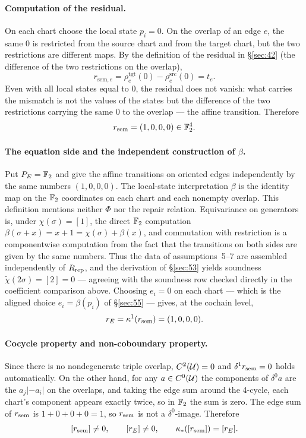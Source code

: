 \begin{example}
\paragraph{Computation of the residual.}
On each chart choose the local state $p_i=0$. On the overlap of an
edge $e$, the same $0$ is restricted from the source chart and from
the target chart, but the two restrictions are different maps. By the
definition of the residual in \S\ref{sec:42} (the difference of the
two restrictions on the overlap),
\[
r_{\mathrm{sem},e}
=\rho^{\mathrm{tgt}}_e(0)-\rho^{\mathrm{src}}_e(0)
=t_e.
\]
Even with all local states equal to $0$, the residual does not
vanish: what carries the mismatch is not the values of the states but
the difference of the two restrictions carrying the same $0$ to the
overlap --- the affine transition. Therefore
\[
r_{\mathrm{sem}}=(1,0,0,0)\in\mathbb{F}_{2}^4.
\]

\paragraph{The equation side and the independent construction of $\beta$.}
Put $P_{E}=\mathbb{F}_{2}$ and give the affine transitions on oriented edges
independently by the same numbers $(1,0,0,0)$. The local-state
interpretation $\beta$ is the identity map on the $\mathbb{F}_{2}$ coordinates
on each chart and each nonempty overlap. This definition mentions
neither $\Phi$ nor the repair relation. Equivariance on generators
is, under $\chi(\sigma)=[1]$, the direct $\mathbb{F}_{2}$ computation
$\beta(\sigma+x)=x+1=\chi(\sigma)+\beta(x)$, and commutation with
restriction is a componentwise computation from the fact that the
transitions on both sides are given by the same numbers. Thus the
data of assumptions~5--7 are assembled independently of $R_{\mathrm{rep}}$, and
the derivation of \S\ref{sec:53} yields soundness
$\widetilde\chi(2\sigma)=[2]=0$ --- agreeing with the soundness row
checked directly in the coefficient comparison above. Choosing
$e_i=0$ on each chart --- which is the aligned choice
$e_i=\beta(p_i)$ of \S\ref{sec:55} --- gives, at the cochain level,
\[
r_{E}=\kappa^1(r_{\mathrm{sem}})=(1,0,0,0).
\]

\paragraph{Cocycle property and non-coboundary property.}
Since there is no nondegenerate triple overlap, $C^2(\mathcal{U})=0$ and
$\delta^1r_{\mathrm{sem}}=0$ holds automatically. On the other hand, for any
$a\in C^0(\mathcal{U})$ the components of $\delta^0a$ are the
$a_j|-a_i|$ on the overlaps, and taking the edge sum around the
4-cycle, each chart's component appears exactly twice, so in $\mathbb{F}_{2}$
the sum is zero. The edge sum of $r_{\mathrm{sem}}$ is $1+0+0+0=1$, so $r_{\mathrm{sem}}$
is not a $\delta^0$-image. Therefore
\[
[r_{\mathrm{sem}}]\ne0,\qquad
[r_{E}]\ne0,\qquad
\kappa_*([r_{\mathrm{sem}}])=[r_{E}].
\]


\end{example}
